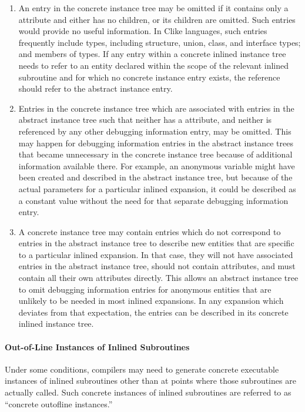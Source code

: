 \begin{enumerate}[1.]
\item An entry in the concrete instance tree may be omitted if
it contains only a  attribute and either
has no children, or its children are omitted. Such entries
would provide no useful information. In C\dash like languages,
such entries frequently include types, including structure,
union, class, and interface types; and members of types. If any
entry within a concrete inlined instance tree needs to refer
to an entity declared within the scope of the relevant inlined
subroutine and for which no concrete instance entry exists,
the reference should refer to the abstract instance entry.

\item Entries in the concrete instance tree which are associated
with entries in the abstract instance tree such that neither
has a  attribute, and neither is referenced by
any other debugging information entry, may be omitted. This
may happen for debugging information entries in the abstract
instance trees that became unnecessary in the concrete instance
tree because of additional information available there. For
example, an anonymous variable might have been created and
described in the abstract instance tree, but because of
the actual parameters for a particular inlined expansion,
it could be described as a constant value without the need
for that separate debugging information entry.

\item A concrete instance tree may contain entries which do
not correspond to entries in the abstract instance tree
to describe new entities that are specific to a particular
inlined expansion. In that case, they will not have associated
entries in the abstract instance tree, should not contain
 attributes, and must contain all their
own attributes directly. This allows an abstract instance tree
to omit debugging information entries for anonymous entities
that are unlikely to be needed in most inlined expansions. In
any expansion which deviates from that expectation, the
entries can be described in its concrete inlined instance tree.

\end{enumerate}

\paragraph{Out-of-Line Instances of Inlined Subroutines}
\label{chap:outoflineinstancesofinlinedsubroutines}
Under some conditions, compilers may need to generate concrete
executable instances of inlined subroutines other than at
points where those subroutines are actually called. Such
concrete instances of inlined subroutines are referred to as
``concrete out\dash of\dash line instances.''

